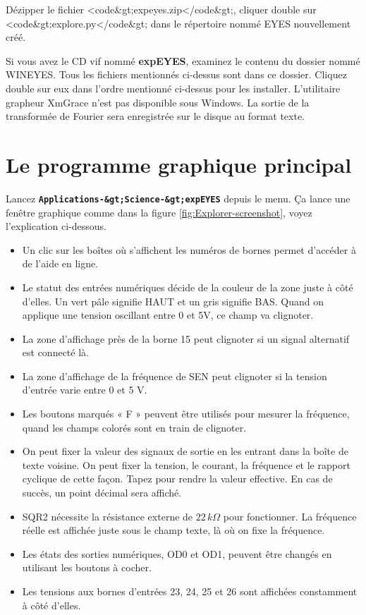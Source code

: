 \documentclass{book}
\newcommand{\nop}{}
\begin{document}
Dézipper le fichier <code\&gt;expeyes.zip</code\&gt;, cliquer double sur <code\&gt;explore.py</code\&gt; dans le répertoire nommé EYES nouvellement créé.



Si vous avez le CD vif nommé \textbf{expEYES}, examinez le contenu du dossier nommé WINEYES. Tous les fichiers mentionnés ci-dessus sont dans ce dossier. Cliquez double sur eux dans l’ordre mentionné ci-dessus pour les installer. L'utilitaire grapheur XmGrace n'est pas disponible sous Windows. La sortie de la transformée de Fourier sera enregistrée sur le disque au format texte.




\section{Le programme graphique principal}


Lancez  \texttt{\textbf{Applications-\&gt;Science-\&gt;expEYES}\nop} depuis le menu. Ça lance une fenêtre graphique comme dans la figure  \ref{fig:Explorer-screenshot}, voyez l'explication ci-dessous.
\begin{itemize}
  \item Un clic sur les boîtes où s'affichent les numéros de bornes permet d'accéder à de l'aide en ligne.
  \item Le statut des entrées numériques décide de la couleur de la zone juste à côté d'elles. Un vert pâle signifie HAUT et un gris signifie BAS. Quand on applique une tension oscillant entre 0 et 5V, ce champ va clignoter.
  \item La zone d'affichage près de la borne 15 peut clignoter si un signal alternatif est connecté là.
  \item La zone d'affichage de la fréquence de SEN peut clignoter si la tension d'entrée varie entre 0 et 5 V.
  \item Les boutons marqués « F » peuvent être utilisés pour mesurer la fréquence, quand les champs colorés sont en train de clignoter.
  \item On peut fixer la valeur des signaux de sortie en les entrant dans la boîte de texte voisine. On peut fixer la tension, le courant, la fréquence et le rapport cyclique de cette façon. Tapez   pour rendre la valeur effective. En cas de succès, un point décimal sera affiché.
  \item SQR2 nécessite la résistance externe de $22\, k\Omega$  pour fonctionner. La fréquence réelle est affichée juste sous le champ texte, là où on fixe la fréquence.
  \item Les états des sorties numériques, OD0 et OD1, peuvent être changés en utilisant les boutons à cocher.
  \item Les tensions aux bornes d'entrées 23, 24, 25 et 26 sont affichées constamment à côté d'elles.
\end{itemize}
\end{document}
